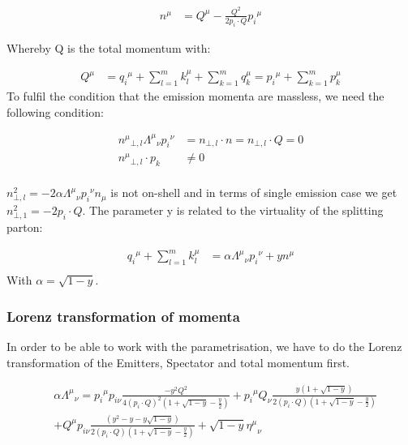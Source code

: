 \begin{equation}
\begin{split}
{n^{\mu}} &= Q^{\mu}-\frac{Q^2}{2p_i \cdot Q} {p_i}^{\mu}
\end{split}	
\end{equation}

Whereby Q is the total momentum with:

\begin{equation}
\begin{split}	
{Q}^{\mu} &= {q_i}^{\mu}+\displaystyle\sum\limits_{l=1}^m k_l^{\mu}+\displaystyle\sum\limits_{k=1}^m q_k^{\mu}={p_i}^{\mu}+\displaystyle\sum\limits_{k=1}^m p_k^{\mu}
\end{split}	
\end{equation}
To fulfil the condition that the emission momenta are massless, we need the following condition:

\begin{equation}
\begin{split}
	{n^{\mu}}_{\bot,l}{\Lambda^{\mu}}_{\nu}{p_i}^{\nu} &= {n_{\bot,l}} \cdot n = {n_{\bot,l}} \cdot Q =0\\
	{n^{\mu}}_{\bot,l}\cdot p_k &\neq0\\
\end{split}	
\end{equation}

$ {n}^2_{\bot,l} = -2\alpha{\Lambda^{\mu}}_{\nu}{p_i}^{\nu} n_{\mu} $ is not on-shell and in terms of single emission case we get $ {n}^2_{\bot,1} = -2p_i\cdot Q $.
The parameter y is related to the virtuality of the splitting parton:

\begin{equation}
\begin{split}
{q_i}^{\mu} +\displaystyle\sum\limits_{l=1}^m k_l^{\mu}   &= \alpha{\Lambda^{\mu}}_{\nu}{p_i}^{\nu} +y{n}^{\mu}\\
    \end{split}
\end{equation}
With $ \alpha = \sqrt{1-y} $.
\subsubsection*{Lorenz transformation of momenta }
In order to be able to work with the parametrisation, we have to do the Lorenz transformation of the Emitters, Spectator and total momentum first.

\begin{equation}
\begin{split}	
&\alpha{\Lambda^{\mu}}_{\nu} = {p_i}^{\mu} p_{i\nu} \frac{-y^2 Q^2}{4(p_i\cdot Q)^2(1+\sqrt{1-y}-\frac{y}{2})}
+{p_i}^{\mu} Q_{\nu} \frac{y(1+\sqrt{1-y})}{2(p_i\cdot Q)(1+\sqrt{1-y}-\frac{y}{2})}\\
&+{Q}^{\mu} p_{i\nu} \frac{(y^2 -y-y\sqrt{1-y})}{2(p_i\cdot Q)(1+\sqrt{1-y}-\frac{y}{2})}+\sqrt{1-y} {\eta^{\mu}}_{\nu}\\
\end{split}
\end{equation}


